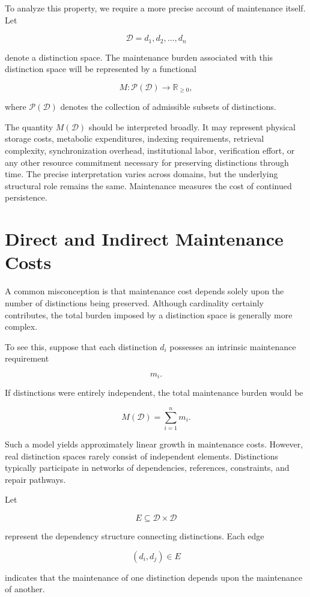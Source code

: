 \documentclass[12pt,oneside]{book}
\theoremstyle{plain} \newtheorem{theorem}{Theorem}[chapter] \newtheorem{lemma}[theorem]{Lemma} \newtheorem{proposition}[theorem]{Proposition} \newtheorem{corollary}[theorem]{Corollary}
\theoremstyle{definition} \newtheorem{definition}[theorem]{Definition} \newtheorem{axiom}[theorem]{Axiom} \newtheorem{construction}[theorem]{Construction}
\theoremstyle{remark} \newtheorem{remark}[theorem]{Remark} \newtheorem{example}[theorem]{Example}
\newcommand{\D}{\mathcal{D}} \newcommand{\R}{\mathcal{R}} \newcommand{\F}{\mathcal{F}} \newcommand{\U}{\mathcal{U}} \newcommand{\M}{\mathcal{M}} \newcommand{\G}{\Gamma}
\begin{document}
To analyze this property, we require a more precise account of maintenance itself. Let

\[
\D = {d_1,d_2,\ldots,d_n}
\]

denote a distinction space. The maintenance burden associated with this distinction space will be represented by a functional

\[
M:\mathcal P(\D)\rightarrow\mathbb R_{\geq 0},
\]

where $\mathcal P(\D)$ denotes the collection of admissible subsets of distinctions.

The quantity $M(\D)$ should be interpreted broadly. It may represent physical storage costs, metabolic expenditures, indexing requirements, retrieval complexity, synchronization overhead, institutional labor, verification effort, or any other resource commitment necessary for preserving distinctions through time. The precise interpretation varies across domains, but the underlying structural role remains the same. Maintenance measures the cost of continued persistence.

\section{Direct and Indirect Maintenance Costs}

A common misconception is that maintenance cost depends solely upon the number of distinctions being preserved. Although cardinality certainly contributes, the total burden imposed by a distinction space is generally more complex.

To see this, suppose that each distinction $d_i$ possesses an intrinsic maintenance requirement

\[
m_i.
\]

If distinctions were entirely independent, the total maintenance burden would be

\[
M(\D)
=
\sum_{i=1}^{n}
m_i.
\]

Such a model yields approximately linear growth in maintenance costs. However, real distinction spaces rarely consist of independent elements. Distinctions typically participate in networks of dependencies, references, constraints, and repair pathways.

Let

\[
E\subseteq \D\times\D
\]

represent the dependency structure connecting distinctions. Each edge

\[
(d_i,d_j)\in E
\]

indicates that the maintenance of one distinction depends upon the maintenance of another.
\end{document}
